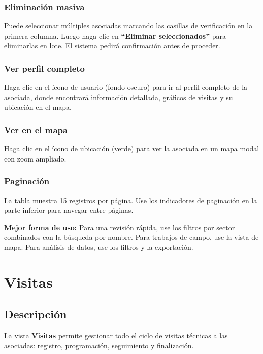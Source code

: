 \documentclass[12pt]{article}
\begin{document}
\subsubsection{Eliminación masiva}
Puede seleccionar múltiples asociadas marcando las casillas de verificación en la primera columna. Luego haga clic en \textbf{``Eliminar seleccionados''} para eliminarlas en lote. El sistema pedirá confirmación antes de proceder.

\subsubsection{Ver perfil completo}
Haga clic en el ícono de usuario (fondo oscuro) para ir al perfil completo de la asociada, donde encontrará información detallada, gráficos de visitas y su ubicación en el mapa.

\subsubsection{Ver en el mapa}
Haga clic en el ícono de ubicación (verde) para ver la asociada en un mapa modal con zoom ampliado.

\subsubsection{Paginación}
La tabla muestra 15 registros por página. Use los indicadores de paginación en la parte inferior para navegar entre páginas.

\begin{tipbox}
  \textbf{Mejor forma de uso:} Para una revisión rápida, use los filtros por sector combinados con la búsqueda por nombre. Para trabajos de campo, use la vista de mapa. Para análisis de datos, use los filtros y la exportación.
\end{tipbox}

\section{Visitas}
\label{sec:visitas}

\subsection{Descripción}
\label{subsec:visitas-descripcion}

La vista \textbf{Visitas} permite gestionar todo el ciclo de visitas técnicas a las asociadas: registro, programación, seguimiento y finalización.
\end{document}
